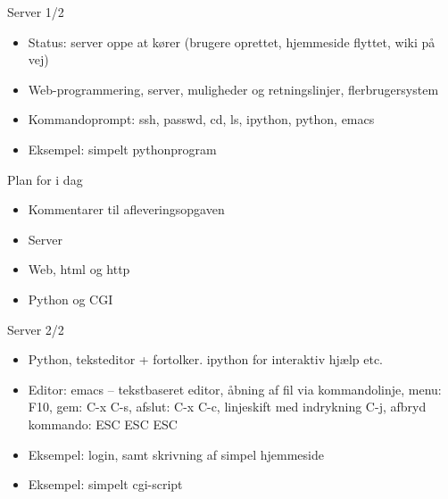 \documentclass[a4paper,landscape]{slides}
\begin{document}
\begin{slide}
	\begin{center} {\large 
            Server 1/2
	} \end{center}
	\begin{itemize} \addtolength{\itemsep}{-\baselineskip}
                \item Status: server oppe at kører (brugere oprettet, hjemmeside flyttet, wiki på vej)
                \item Web-programmering, server, muligheder og retningslinjer, flerbrugersystem
                \item Kommandoprompt: ssh, passwd, cd, ls, ipython, python, emacs
                \item Eksempel: simpelt pythonprogram
	\end{itemize}
\end{slide}

\begin{slide}
	\begin{center} {\large 
            Plan for i dag
	} \end{center}
	\begin{itemize} \addtolength{\itemsep}{-\baselineskip}
		\item Kommentarer til afleveringsopgaven
		\item Server
		\item Web, html og http
		\item Python og CGI
	\end{itemize}
\end{slide}

\begin{slide}
	\begin{center} {\large 
            Server 2/2
	} \end{center}
	\begin{itemize} \addtolength{\itemsep}{-\baselineskip}
                \item Python, teksteditor + fortolker. ipython for interaktiv hjælp etc.
                \item Editor: emacs -- tekstbaseret editor, åbning af fil via kommandolinje, menu: F10, gem: C-x C-s, afslut: C-x C-c, linjeskift med indrykning C-j, afbryd kommando: ESC ESC ESC
                \item Eksempel: login, samt skrivning af simpel hjemmeside
                \item Eksempel: simpelt cgi-script
	\end{itemize}
\end{slide}
\end{document}

